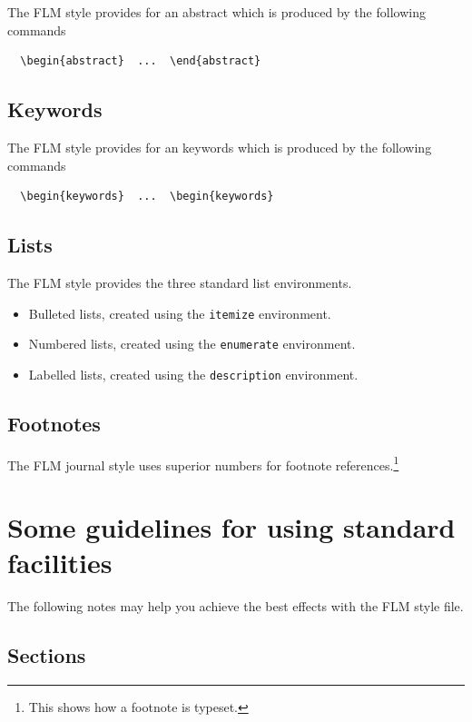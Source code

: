 \documentclass[lineno]{JFM-FLM_Au}
\begin{document}
The FLM style provides for an abstract which is produced by the following
commands
%
\begin{verbatim}
  \begin{abstract}  ...  \end{abstract}
\end{verbatim}

\subsection{Keywords}

The FLM style provides for an keywords which is produced by the following
commands
%
\begin{verbatim}
  \begin{keywords}  ...  \begin{keywords}
\end{verbatim}

\subsection{Lists}

The FLM style provides the three standard list environments.
\begin{itemize}
  \item Bulleted lists, created using the \verb"itemize" environment.
  \item Numbered lists, created using the \verb"enumerate" environment.
  \item Labelled lists, created using the \verb"description" environment.
\end{itemize}

\subsection{Footnotes}

The FLM journal style uses superior numbers for footnote
references.\footnote{This shows how a footnote is typeset.}

\section{Some guidelines for using standard facilities}

The following notes may help you achieve the best effects with the FLM style
file.

\subsection{Sections}
\end{document}
